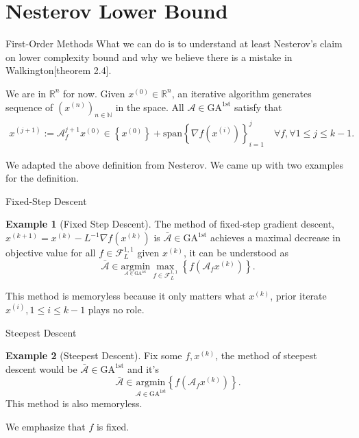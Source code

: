 \documentclass[11pt]{beamer}
\theoremstyle{definition}
\newtheorem{exmp}{Example}[section]
\begin{document}
\section{Nesterov Lower Bound}
\newcommand*{\GAfirst}{\text{GA}^{\text{1st}}}
    \begin{frame}{First-Order Methods}
        What we can do is to understand at least Nesterov's claim on lower complexity bound and why we believe there is a mistake in Walkington[theorem 2.4]\cite{noel_nesterovs_nodate}. 
        \begin{definition}
            We are in $\mathbb R^n$ for now. Given $x^{(0)} \in \mathbb R^n$, an iterative algorithm generates sequence of $\left(x^{(n)}\right)_{n \in \mathbb N}$ in the space. All $\mathcal A \in \GAfirst$ satisfy that 
            \begin{align*}
                 x^{(j + 1)}:= \mathcal A_f^{j + 1}x^{(0)} \in \left\{x^{(0)}\right\} + 
                \text{span}\left\{\nabla f\left(x^{(i)}\right)\right\}_{i = 1}^{j} \quad \forall f, \forall 1\le j \le k -1. 
            \end{align*}
        \end{definition}
        We adapted the above definition from Nesterov\cite[2.1.4]{nesterov_lecture_2018}. 
        We came up with two examples for the definition. 
    \end{frame}  
    \begin{frame}{Fixed-Step Descent}
        \begin{exmp}[Fixed Step Descent]
            The method of fixed-step gradient descent, $x^{(k + 1)} = x^{(k)} - L^{-1}\nabla f(x^{(k)})$ is $ \bar {\mathcal A}\in \GAfirst$ achieves a maximal decrease in objective value for all $f\in \mathcal F_{L}^{1, 1}$ given $x^{(k)}$, it can be understood as 
            \[
                \bar {\mathcal A} \in 
                \underset{_{\mathcal A\in \GAfirst}}{\text{argmin}}
                \max_{f\in \mathcal F_L^{1, 1}} \left\lbrace
                    f\left(
                        \mathcal A_f x^{(k)}
                    \right)
                \right\rbrace. 
            \]
        \end{exmp}
        This method is memoryless because it only matters what $x^{(k)}$, prior iterate $x^{(i)}, 1\le i \le k-1$ plays no role. 
    \end{frame}
    \begin{frame}{Steepest Descent}
        \begin{exmp}[Steepest Descent]
            Fix some $f, x^{(k)}$, the method of steepest descent would be $\bar {\mathcal A}\in \GAfirst$ and it's 
            \[
                \bar {\mathcal A}\in  \underset{\mathcal A \in \GAfirst}{\text{argmin}}
                \left\lbrace
                    f\left(
                        \mathcal A_f x^{(k)}
                    \right)
                \right\rbrace. 
            \]
            This method is also memoryless.     
        \end{exmp}
        We emphasize that $f$ is fixed. 
        
    \end{frame}
\end{document}
